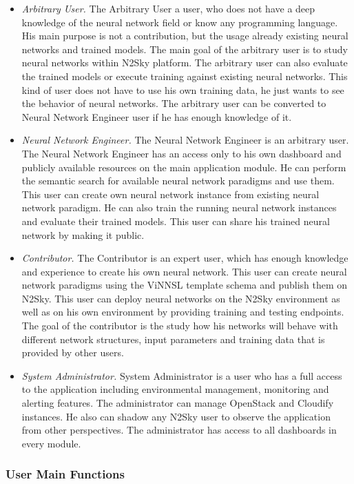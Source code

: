 \begin{itemize}
\item \emph{Arbitrary User.}  The Arbitrary User a user, who does not have a deep knowledge of the neural network field or know any programming language. His main purpose is not a contribution, but the usage already existing neural networks and trained models. The main goal of the arbitrary user is to study neural networks within N2Sky platform. The arbitrary user can also evaluate the trained models or execute training against existing neural networks. This kind of user does not have to use his own training data, he just wants to see the behavior of neural networks. The arbitrary user can be converted to Neural Network Engineer user if he has enough knowledge of it. 
\item \emph{Neural Network Engineer.} The Neural Network Engineer is an arbitrary user. The Neural Network Engineer has an access only to his own dashboard and publicly available resources on the main application module. He can perform the semantic search for available neural network paradigms and use them. This user can create own neural network instance from existing neural network paradigm. He can also train the running neural network instances and evaluate their trained models. This user can share his trained neural network by making it public. 
\item \emph{Contributor.} The Contributor is an expert user, which has enough knowledge and experience to create his own neural network. This user can create neural network paradigms using the ViNNSL template schema and publish them on N2Sky. This user can deploy neural networks on the N2Sky environment as well as on his own environment by providing training and testing endpoints. The goal of the contributor is the study how his networks will behave with different network structures, input parameters and training data that is provided by other users.
\item \emph{System Administrator.} System Administrator is a user who has a full access to the application including environmental management, monitoring and alerting features. The administrator can manage OpenStack and Cloudify instances. He also can shadow any N2Sky user to observe the application from other perspectives. The administrator has access to all dashboards in every module.
\end{itemize}


\subsubsection{User Main Functions}\label{User Permissions}

